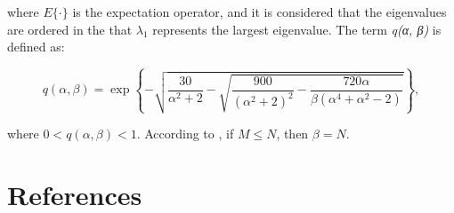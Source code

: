 \documentclass[review]{elsarticle}
\begin{document}
where $E\{\cdot\} $ is the expectation operator, and it is considered that the eigenvalues are ordered in the that $\lambda_1$ represents the largest eigenvalue. The term \emph{q(α, β)} is defined as:

\begin{equation}\label{eq:eq4}
q(\alpha,\beta) = \exp\left\{-\sqrt{\frac{30}{\alpha^2 + 2} - \sqrt{\frac{900}{(\alpha^2 + 2)^2} - \frac{720\alpha}{\beta(\alpha^4 + \alpha^2 - 2)}}} \right\},
\end{equation}

where $0 < q(\alpha,\beta) < 1$. According to \cite{quinlan2006model}, if $M \leq N$, then $\beta = N$.

\section*{References}


\end{document}
